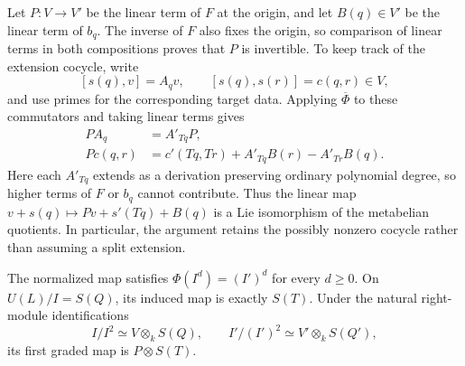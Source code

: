Let \(P:V\to V'\) be the linear term of \(F\) at the origin, and let
\(B(q)\in V'\) be the linear term of \(b_q\).
The inverse of \(F\) also fixes the origin, so comparison of linear
terms in both compositions proves that \(P\) is invertible.
To keep track of the extension cocycle, write
\[
 [s(q),v]=A_qv,\qquad [s(q),s(r)]=c(q,r)\in V,
\]
and use primes for the corresponding target data. Applying
\(\overline\Phi\) to these commutators and taking linear terms gives
\begin{align}
 PA_q&=A'_{Tq}P,\label{eq:linear-action}\\
 Pc(q,r)&=c'(Tq,Tr)+A'_{Tq}B(r)-A'_{Tr}B(q).
 \label{eq:linear-cocycle}
\end{align}
Here each \(A'_{Tq}\) extends as a derivation preserving ordinary
polynomial degree, so higher terms of \(F\) or \(b_q\) cannot contribute.
Thus the linear map
\(v+s(q)\mapsto Pv+s'(Tq)+B(q)\) is a Lie isomorphism of the
metabelian quotients. In particular, the argument retains the
possibly nonzero cocycle rather than assuming a split extension.

\begin{proposition}\label{prop:filtered-linearization}
The normalized map satisfies \(\Phi(I^d)=(I')^d\) for every
\(d\geq0\). On \(U(L)/I=S(Q)\), its induced map is exactly \(S(T)\).
Under the natural right-module identifications
\[
 I/I^2\simeq V\otimes_k S(Q),\qquad
 I'/(I')^2\simeq V'\otimes_k S(Q'),
\]
its first graded map is \(P\otimes S(T)\).
\end{proposition}

